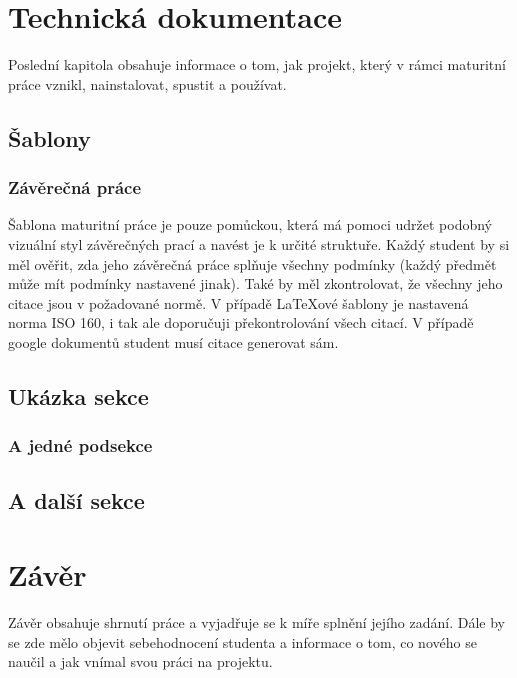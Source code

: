 \documentclass[11pt,a4paper,twoside,openright]{report}
\begin{document}
\chapter{Technická dokumentace}

Poslední kapitola obsahuje informace o tom, jak projekt, který v rámci maturitní práce vznikl, nainstalovat, spustit a používat.


\section{Šablony}
\subsection{Závěrečná práce}
Šablona maturitní práce je pouze pomůckou, která má pomoci udržet podobný vizuální styl závěrečných prací a navést je k určité struktuře. Každý student by si měl ověřit, zda jeho závěrečná práce splňuje všechny podmínky (každý předmět může mít podmínky nastavené jinak). Také by měl zkontrolovat, že všechny jeho citace jsou v požadované normě. V případě LaTeXové šablony je nastavená norma ISO 160, i tak ale doporučuji překontrolování všech citací. V případě google dokumentů student musí citace generovat sám.

\section{Ukázka sekce}

\lipsum[5]

\subsection{A jedné podsekce}

\lipsum

\section{A další sekce}

\lipsum

\chapter*{Závěr}
\pagestyle{empty}

Závěr obsahuje shrnutí práce a vyjadřuje se k míře splnění jejího zadání. Dále by se zde mělo objevit sebehodnocení studenta a informace o tom, co nového se naučil a jak vnímal svou práci na projektu.
\end{document}
